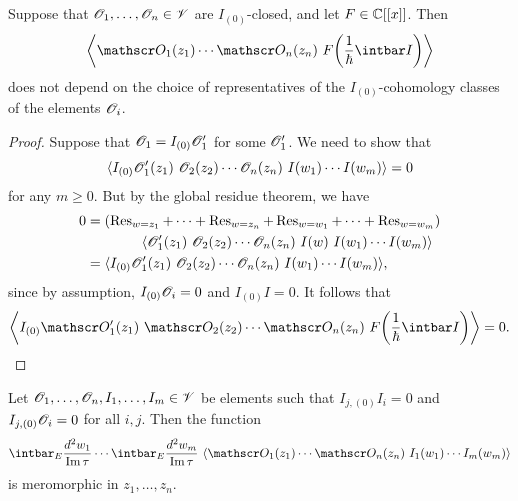 \begin{lemma}
    \label{lem-new-conf-block-well-defined}
    Suppose that $\mathscr{O}_1, \dotsc, \mathscr{O}_n \in \mathscr{V}$
    are $I_{(0)}$-closed, and let $F \in \mathbb{C}[[x]]$. Then
    \[
        \biggl\langle
            \scrO_1 (z_1) \cdots \scrO_n (z_n) \ 
            F \biggl( \frac{1}{\hbar} \intbar I \biggr)
        \biggr\rangle
    \]
    does not depend on the choice of representatives
    of the $I_{(0)}$-cohomology classes of the elements $\mathscr{O}_i$.
\end{lemma}

\begin{proof}
    Suppose that $\mathscr{O}_1 = I_{(0)} \mathscr{O}'_1$ for some $\mathscr{O}'_1$.
    We need to show that
    \[
        \langle
            I_{(0)} \scrO'_1 (z_1) \ 
            \scrO_2 (z_2) \cdots \scrO_n (z_n) \ 
            I (w_1) \cdots I (w_m)
        \rangle
        = 0
    \]
    for any $m \geq 0$.
    But by the global residue theorem, we have
    \begin{align*}
        0
        & =
        (
            \Res_{w = z_1} + \cdots + \Res_{w = z_n}
            + \Res_{w = w_1} + \cdots + \Res_{w = w_m}
        ) \\
        & \hspace{4em}
        \langle
            \scrO'_1 (z_1) \ 
            \scrO_2 (z_2) \cdots \scrO_n (z_n) \ 
            I (w) \ I (w_1) \cdots I (w_m)
        \rangle \\
        & =
        \langle
            I_{(0)} \scrO'_1 (z_1) \ 
            \scrO_2 (z_2) \cdots \scrO_n (z_n) \ 
            I (w_1) \cdots I (w_m)
        \rangle ,
    \end{align*}
    since by assumption, $I_{(0)} \mathscr{O}_i = 0$ and $I_{(0)} I = 0$.
    It follows that
    \[
        \biggl\langle
            I_{(0)} \scrO'_1 (z_1) \ 
            \scrO_2 (z_2) \cdots \scrO_n (z_n) \ 
            F \biggl( \frac{1}{\hbar} \intbar I \biggr)
        \biggr\rangle
        = 0.
        \qedhere
    \]
\end{proof}


\begin{lemma}
    \label{lem-meromorphic}
    Let $\mathscr{O}_1, \dotsc, \mathscr{O}_n, I_1, \dotsc, I_m \in \mathscr{V}$
    be elements such that $I_{j, (0)} I_i = 0$
    and $I_{j, (0)} \mathscr{O}_i = 0$ for all $i, j$.
    Then the function
    \[
        \intbar_E \frac {d^2 w_1} {\im \tau} \cdots
        \intbar_E \frac {d^2 w_m} {\im \tau} \ 
        \langle
            \scrO_1 (z_1) \cdots \scrO_n (z_n) \ 
            I_1 (w_1) \cdots I_m (w_m)
        \rangle
    \]
    is meromorphic in $z_1, \dotsc, z_n$.
\end{lemma}

